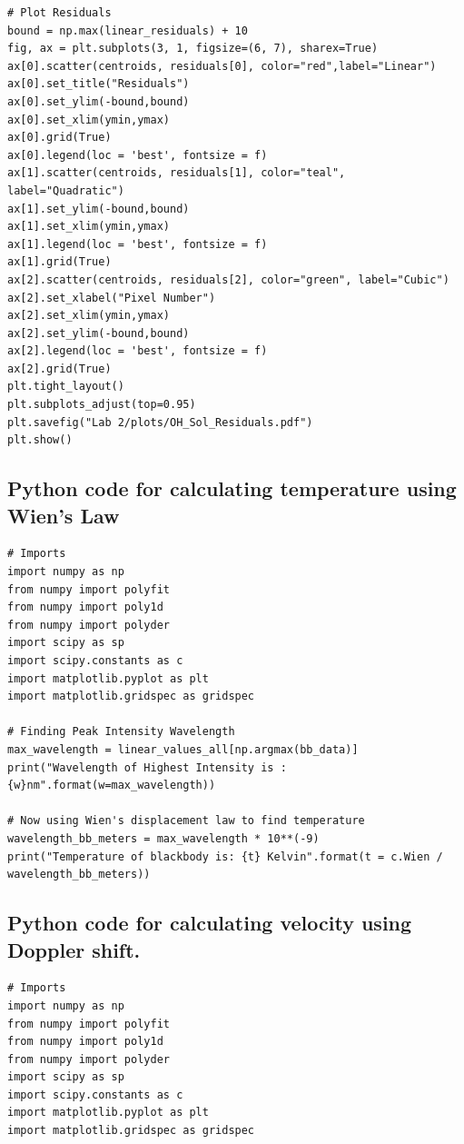 \documentclass{article}
\begin{document}
\begin{appendices}
\begin{footnotesize}
\begin{verbatim}
# Plot Residuals
bound = np.max(linear_residuals) + 10
fig, ax = plt.subplots(3, 1, figsize=(6, 7), sharex=True)
ax[0].scatter(centroids, residuals[0], color="red",label="Linear")
ax[0].set_title("Residuals")
ax[0].set_ylim(-bound,bound)
ax[0].set_xlim(ymin,ymax)
ax[0].grid(True)
ax[0].legend(loc = 'best', fontsize = f)
ax[1].scatter(centroids, residuals[1], color="teal", label="Quadratic")
ax[1].set_ylim(-bound,bound)
ax[1].set_xlim(ymin,ymax)
ax[1].legend(loc = 'best', fontsize = f)
ax[1].grid(True)
ax[2].scatter(centroids, residuals[2], color="green", label="Cubic")
ax[2].set_xlabel("Pixel Number")
ax[2].set_xlim(ymin,ymax)
ax[2].set_ylim(-bound,bound)
ax[2].legend(loc = 'best', fontsize = f)
ax[2].grid(True)
plt.tight_layout()
plt.subplots_adjust(top=0.95)  
plt.savefig("Lab 2/plots/OH_Sol_Residuals.pdf")
plt.show()
\end{verbatim}
\end{footnotesize}
\label{code:solution}
\subsection{Python code for calculating temperature using Wien's Law}
\begin{footnotesize}
\begin{verbatim}
# Imports 
import numpy as np
from numpy import polyfit
from numpy import poly1d
from numpy import polyder
import scipy as sp
import scipy.constants as c
import matplotlib.pyplot as plt
import matplotlib.gridspec as gridspec

# Finding Peak Intensity Wavelength 
max_wavelength = linear_values_all[np.argmax(bb_data)]
print("Wavelength of Highest Intensity is : {w}nm".format(w=max_wavelength))

# Now using Wien's displacement law to find temperature
wavelength_bb_meters = max_wavelength * 10**(-9)
print("Temperature of blackbody is: {t} Kelvin".format(t = c.Wien / wavelength_bb_meters))
\end{verbatim}
\end{footnotesize}
\label{code:temperature}
\subsection{Python code for calculating velocity using Doppler shift.}
\begin{footnotesize}
\begin{verbatim}
# Imports 
import numpy as np
from numpy import polyfit
from numpy import poly1d
from numpy import polyder
import scipy as sp
import scipy.constants as c
import matplotlib.pyplot as plt
import matplotlib.gridspec as gridspec


\end{verbatim}
\end{footnotesize}
\end{appendices}
\end{document}
